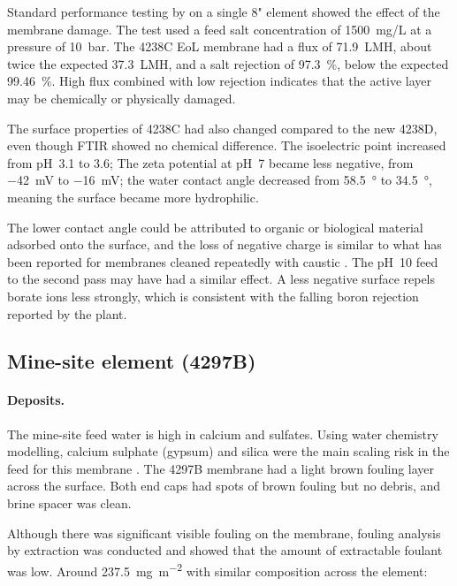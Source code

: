 

Standard performance testing by \cite{MembraneWorks2025Desal} on a single 8" element showed the effect of the membrane damage. The test used a feed salt concentration of \qty{1500}{mg/L} at a pressure of \qty{10}{bar}. The 4238C EoL membrane had a flux of \qty{71.9}{LMH}, about twice the expected \qty{37.3}{LMH}, and a salt rejection of \qty{97.3}{\percent}, below the expected \qty{99.46}{\percent}. High flux combined with low rejection indicates that the active layer may be chemically or physically damaged.

The surface properties of 4238C had also changed compared to the new 4238D, even though FTIR showed no chemical difference. The isoelectric point increased from pH~3.1 to 3.6; The zeta potential at pH~7 became less negative, from \qty{-42}{mV} to \qty{-16}{mV}; the water contact angle decreased from \qty{58.5}{\degree} to \qty{34.5}{\degree}, meaning the surface became more hydrophilic.

The lower contact angle could be attributed to organic or biological material adsorbed onto the surface, and the loss of negative charge is similar to what has been reported for membranes cleaned repeatedly with caustic \cite{MembraneWorks2025Desal}. The pH~10 feed to the second pass may have had a similar effect. A less negative surface repels borate ions less strongly, which is consistent with the falling boron rejection reported by the plant.


\subsection{Mine-site element (4297B)}
\paragraph{Deposits.}
The mine-site feed water is high in calcium and sulfates. Using water chemistry modelling, calcium sulphate (gypsum) and silica were the main scaling risk in the feed for this membrane \citep{MembraneWorks2026Mine}. The 4297B membrane had a light brown fouling layer across the surface. Both end caps had spots of brown fouling but no debris, and brine spacer was clean. 

Although there was significant visible fouling on the membrane, fouling analysis by extraction was conducted and showed that the amount of extractable foulant was low. Around \qty{237.5}{mg.m^{-2}} with similar composition across the element: 


